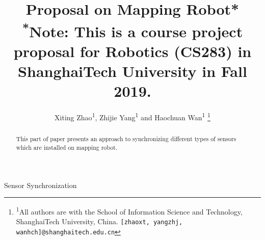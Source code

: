 \documentclass[conference]{IEEEtran}
\begin{document}
	
	\title{Proposal on Mapping Robot*\\
		{\footnotesize \textsuperscript{*}Note: This is a course project proposal for Robotics (CS283) in ShanghaiTech University in Fall 2019.}
	}
	
	\author{
		Xiting Zhao\textsuperscript{1}, Zhijie Yang\textsuperscript{1} and Haochuan Wan\textsuperscript{1}
		\thanks{\textsuperscript{1}All authors are with the School of Information Science and Technology, 
			ShanghaiTech University, China.
			{\tt\small [zhaoxt, yangzhj, wanhch]@shanghaitech.edu.cn}}%
	}
	
	\maketitle
	
	\begin{abstract}
		This part of paper presents an approach to synchronizing different types of sensors which are installed on mapping robot.
	\end{abstract}
	
	\begin{IEEEkeywords}
		Sensor Synchronization
	\end{IEEEkeywords}
	
\end{document}
